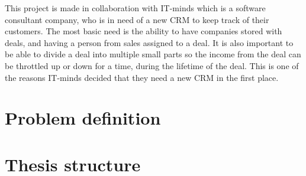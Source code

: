 This project is made in collaboration with IT-minds which is a software consultant company,
who is in need of a new CRM to keep track of their customers. The most basic need is
the ability to have companies stored with deals, and having a person from sales assigned
to a deal. It is also important to be able to divide a deal into multiple small parts
so the income from the deal can be throttled up or down for a time, during the lifetime
of the deal. This is one of the reasons IT-minds decided that they need a new CRM in the
first place.


\section{Problem definition}
\label{sec:Problem definition}

\section{Thesis structure}
\label{sec:Thesis structure}
